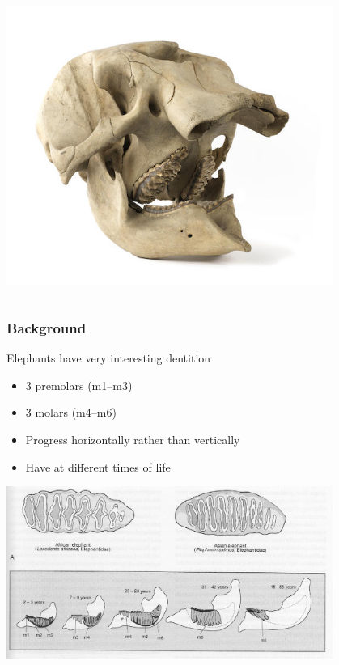 \documentclass[10pt]{beamer}
\begin{document}
\begin{frame}[t]
\begin{columns}
		\begin{column}{0.5\textwidth}
			\begin{center}
				\includegraphics[width=0.8\textwidth]{figures/skull2.jpg}
			\end{center}
		\end{column}
	\end{columns}		
\end{frame}   


\begin{frame}[t]
\frametitle{Background}
\vspace{0.5cm}

	Elephants have very interesting dentition
		\begin{itemize}
			\item 3 premolars (m1--m3)
			\item 3 molars (m4--m6)
			\item Progress horizontally rather than vertically
			\item Have at different times of life
		\end{itemize}
	
	\vspace{0.25cm}
	
	\begin{center}
		\includegraphics[width=0.8\textwidth]{figures/teeth.pdf}
	\end{center}	
\end{frame}   
\end{document}
